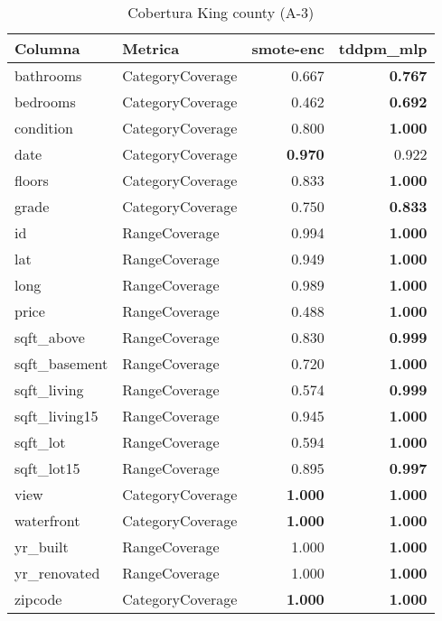 \begin{table}[H]
\centering
\caption{Cobertura King county (A-3)}
\label{table-coverage-king county-a-3}
\begin{tabular}{|l|l|r|r|}
\hline
\rowcolor[gray]{0.8}
Columna & Metrica & smote-enc & tddpm\_mlp \\
\hline bathrooms & CategoryCoverage & 0.667 & \bfseries 0.767 \\
\hline bedrooms & CategoryCoverage & 0.462 & \bfseries 0.692 \\
\hline condition & CategoryCoverage & 0.800 & \bfseries 1.000 \\
\hline date & CategoryCoverage & \bfseries 0.970 & 0.922 \\
\hline floors & CategoryCoverage & 0.833 & \bfseries 1.000 \\
\hline grade & CategoryCoverage & 0.750 & \bfseries 0.833 \\
\hline id & RangeCoverage & 0.994 & \bfseries 1.000 \\
\hline lat & RangeCoverage & 0.949 & \bfseries 1.000 \\
\hline long & RangeCoverage & 0.989 & \bfseries 1.000 \\
\hline price & RangeCoverage & 0.488 & \bfseries 1.000 \\
\hline sqft\_above & RangeCoverage & 0.830 & \bfseries 0.999 \\
\hline sqft\_basement & RangeCoverage & 0.720 & \bfseries 1.000 \\
\hline sqft\_living & RangeCoverage & 0.574 & \bfseries 0.999 \\
\hline sqft\_living15 & RangeCoverage & 0.945 & \bfseries 1.000 \\
\hline sqft\_lot & RangeCoverage & 0.594 & \bfseries 1.000 \\
\hline sqft\_lot15 & RangeCoverage & 0.895 & \bfseries 0.997 \\
\hline view & CategoryCoverage & \bfseries 1.000 & \bfseries 1.000 \\
\hline waterfront & CategoryCoverage & \bfseries 1.000 & \bfseries 1.000 \\
\hline yr\_built & RangeCoverage & 1.000 & \bfseries 1.000 \\
\hline yr\_renovated & RangeCoverage & 1.000 & \bfseries 1.000 \\
\hline zipcode & CategoryCoverage & \bfseries 1.000 & \bfseries 1.000 \\
\hline
\end{tabular}
\end{table}
